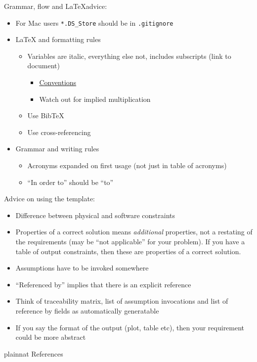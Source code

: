 \documentclass[12pt]{article}
\begin{document}
\noindent Grammar, flow and \LaTeX advice:
\begin{itemize}
\item For Mac users \texttt{*.DS\_Store} should be in \texttt{.gitignore}
\item \LaTeX{} and formatting rules
\begin{itemize}
\item Variables are italic, everything else not, includes subscripts (link to
  document)
\begin{itemize}
\item \href{https://physics.nist.gov/cuu/pdf/typefaces.pdf}{Conventions}
\item Watch out for implied multiplication
\end{itemize}
\item Use BibTeX
\item Use cross-referencing
\end{itemize}
\item Grammar and writing rules
\begin{itemize}
\item Acronyms expanded on first usage (not just in table of acronyms)
\item ``In order to'' should be ``to''
\end{itemize}
\end{itemize}

\noindent Advice on using the template:
\begin{itemize}
\item Difference between physical and software constraints
\item Properties of a correct solution means \emph{additional} properties, not
  a restating of the requirements (may be ``not applicable'' for your problem).
  If you have a table of output constraints, then these are properties of a
  correct solution.
\item Assumptions have to be invoked somewhere
\item ``Referenced by'' implies that there is an explicit reference
\item Think of traceability matrix, list of assumption invocations and list of
  reference by fields as automatically generatable
\item If you say the format of the output (plot, table etc), then your
  requirement could be more abstract
\end{itemize}

\newpage

 {plainnat}
 {References}
\end{document}
